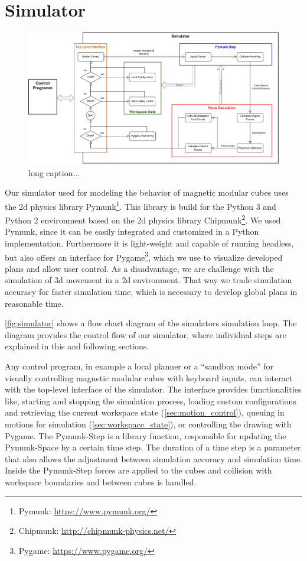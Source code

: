 \chapter{Simulator}
\label{chap:sim}

\begin{figure}
	\centering
	\includegraphics[width=1\textwidth]{figures/simulator_controlflow.pdf}
	\caption[Control flow of the simulator]{long caption...}
	\label{fig:simulator}
\end{figure}

Our simulator used for modeling the behavior of magnetic modular cubes uses the 2d physics library Pymunk\footnote{Pymunk: \url{https://www.pymunk.org/}}.
This library is build for the Python 3 and Python 2 environment based on the 2d physics library Chipmunk\footnote{Chipmunk: \url{http://chipmunk-physics.net/}}.
We used Pymunk, since it can be easily integrated and customized in a Python implementation.
Furthermore it is light-weight and capable of running headless, but also offers an interface for Pygame\footnote{Pygame: \url{https://www.pygame.org/}}, which we use to visualize developed plans and allow user control.
As a disadvantage, we are challenge with the simulation of 3d movement in a 2d environment.
That way we trade simulation accuracy for faster simulation time, which is necessary to develop global plans in reasonable time.

\autoref{fig:simulator} shows a flow chart diagram of the simulators simulation loop.
The diagram provides the control flow of our simulator, where individual steps are explained in this and following sections.

Any control program, in example a local planner or a ``sandbox mode'' for visually controlling magnetic modular cubes with keyboard inputs, can interact with the top-level interface of the simulator.
The interface provides functionalities like, starting and stopping the simulation process, loading custom configurations and retrieving the current workspace state (\autoref{sec:motion_control}), queuing in motions for simulation (\autoref{sec:workspace_state}), or controlling the drawing with Pygame.
The Pymunk-Step is a library function, responsible for updating the Pymunk-Space by a certain time step.
The duration of a time step is a parameter that also allows the adjustment between simulation accuracy and simulation time.
Inside the Pymunk-Step forces are applied to the cubes and collision with workspace boundaries and between cubes is handled.

